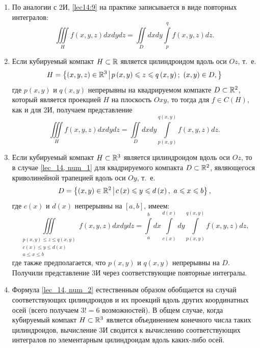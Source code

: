 \documentclass[../../main.tex]{subfiles}
\begin{document}
	\begin{rems}
		\quad
		\begin{enumerate}
			\item По аналогии с 2И, \eqref{lec14:9} на практике записывается в виде 
			повторных 
			интегралов:
			\begin{equation}
			\iiint\limits_{H} f \left( x, y, z \right) dx dy dz = \iint\limits_{D} 
			dx dy \int\limits_{p}^{q} f\left(x, y, 
			z\right) dz. \label{lec_14, num_1}
			\end{equation}
			
			\item Если кубируемый компакт $H \subset \mathbb{R}$ является цилиндроидом вдоль 
			оси $Oz$, 
			т.~е. 
			\[H = \left\{\left(x, y, z \right) \in \R^3 \; \vline \; p \left(x, 
			y\right) \leq z \leq q \left(x, y \right);\  \left(x, y\right) \in D,
			\right\} \]
			где $p\left(x, y\right)$ и $q\left(x, y\right)$ непрерывны на квадрируемом 
			компакте $D \subset \mathbb{R}^2$, который является проекцией $H$ на плоскость 
			$Oxy$, то тогда для $f 
			\in C\left(H\right)$, как и для 2И, получаем представление
			\[\iiint\limits_{H} f \left( x, y, z \right) dx dy dz = \iint\limits_{D} 
			dx dy \int\limits_{p\left(x, y\right)}^{q\left(x, y \right)} f\left(x, y, 
			z\right) dz.\]
			
			\item Если кубируемый компакт $H \subset \mathbb{R}^3$ является цилиндроидом вдоль 
			оси 
			$Oz$, то в случае \eqref{lec_14, num_1} для квадрируемого компакта $D 
			\subset \mathbb{R}^2$, являющегося криволинейной трапецией вдоль оси $Oy$, т.~е.
			\[D = \left\{\left(x, y\right) \in \R^2 \; \vline \; c \left(x\right) \leq 
			y \leq d \left(x \right),\ a \leq x \leq b \right\}, \]
			где $c(x)$ и $d(x)$ непрерывны на $\left[a, b\right]$, имеем:
			\begin{equation}
			\iiint\limits_{\substack{
				p\left(x, y\right) \leq z \leq q\left(x, y\right)\\
				c\left(x\right) \leq y \leq d\left(x\right)\\
				a \leq x \leq b
				}} f \left( x, y, z \right) dx dy dz = \int\limits_{a}^{b} dx 
				\int\limits_{c\left(x\right)}^{d\left(x\right)} dy \int\limits_{p\left(x, 
				y\right)}^{q\left(x, y\right)} f(x, y, z) dz, \label{lec_14, num_2}
			\end{equation}
			где также предполагается, что $p\left(x, y\right)$ и $q\left(x, y\right)$ 
			непрерывны на $D$.
			Получили представление 3И через соответствующие повторные интегралы.
			
			\item Формула \eqref{lec_14, num_2} естественным образом обобщается на 
			случай соответствующих цилиндроидов и их проекций вдоль других координатных 
			осей (всего получаем $3! = 6$ возможностей). В общем случае, когда 
			кубируемый компакт $H \subset \mathbb{R}^3$ является объединением конечного числа 
			таких цилиндроидов, вычисление 3И сводится к вычислению соответствующих 
			интегралов по элементарным цилиндроидам вдоль каких-либо осей. 
		\end{enumerate}
	\end{rems}
\end{document}
